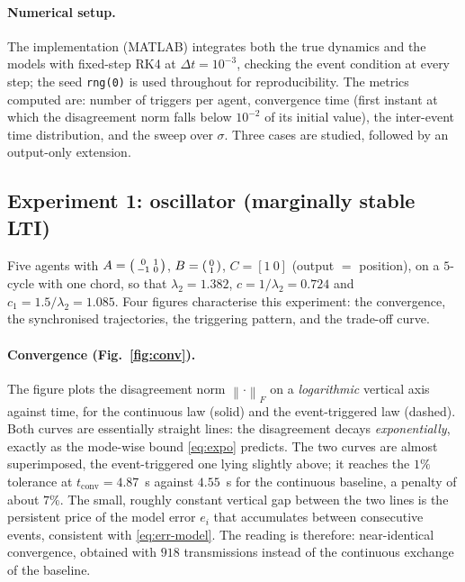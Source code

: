 \documentclass[11pt,a4paper]{article}
\theoremstyle{remark}
\newcommand{\norm}[1]{\left\lVert#1\right\rVert}
\begin{document}
\paragraph{Numerical setup.} The implementation (MATLAB) integrates both the true dynamics and the
models with fixed-step RK4 at $\Delta t=10^{-3}$, checking the event condition at every step; the
seed \texttt{rng(0)} is used throughout for reproducibility. The metrics computed are: number of
triggers per agent, convergence time (first instant at which the disagreement norm falls below
$10^{-2}$ of its initial value), the inter-event time distribution, and the sweep over $\sigma$.
Three cases are studied, followed by an output-only extension.

\subsection{Experiment 1: oscillator (marginally stable LTI)}
Five agents with $A=\begin{psmallmatrix}0&1\\-1&0\end{psmallmatrix}$,
$B=\begin{psmallmatrix}0\\1\end{psmallmatrix}$, $C=[1\ 0]$ (output $=$ position), on a $5$-cycle with
one chord, so that $\lambda_2=1.382$, $c=1/\lambda_2=0.724$ and $c_1=1.5/\lambda_2=1.085$. Four
figures characterise this experiment: the convergence, the synchronised trajectories, the triggering
pattern, and the trade-off curve.

\paragraph{Convergence (Fig.~\ref{fig:conv}).} The figure plots the disagreement norm
$\norm{\cdot}_F$ on a \emph{logarithmic} vertical axis against time, for the continuous law (solid)
and the event-triggered law (dashed). Both curves are essentially straight lines: the disagreement
decays \emph{exponentially}, exactly as the mode-wise bound \eqref{eq:expo} predicts. The two curves
are almost superimposed, the event-triggered one lying slightly above; it reaches the $1\%$ tolerance
at $t_{\mathrm{conv}}=4.87$~s against $4.55$~s for the continuous baseline, a penalty of about
$7\%$. The small, roughly constant vertical gap between the two lines is the persistent price of the
model error $e_i$ that accumulates between consecutive events, consistent with \eqref{eq:err-model}.
The reading is therefore: near-identical convergence, obtained with $918$ transmissions instead of
the continuous exchange of the baseline.
\end{document}
